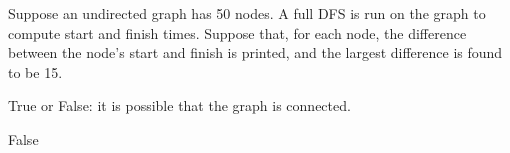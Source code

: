 \begin{prob}

    Suppose an undirected graph has 50 nodes. A full DFS is run on the graph to
    compute start and finish times. Suppose that, for each node, the difference
    between the node's start and finish is printed, and the largest difference
    is found to be 15.

    True or False: it is possible that the graph is connected.

    \tF{}

    \begin{soln}
        False
    \end{soln}

\end{prob}
